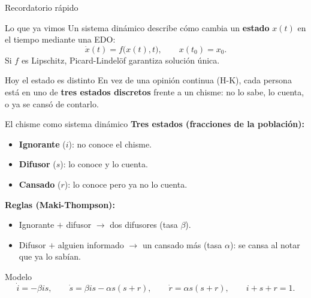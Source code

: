 \documentclass[aspectratio=169,10pt]{beamer}
\begin{document}
	\begin{frame}{Recordatorio r\'apido}
		\vspace{4pt}
		\begin{defbox}{Lo que ya vimos}
			Un sistema din\'amico describe c\'omo cambia un \textbf{estado}
			$x(t)$ en el tiempo mediante una EDO:
			\[
			\dot{x}(t) = f\!\bigl(x(t),t\bigr), \qquad x(t_0)=x_0.
			\]
			Si $f$ es Lipschitz, Picard-Lindel\"of garantiza soluci\'on \'unica.
		\end{defbox}
		
		\vspace{8pt}
		\begin{taskbox}{Hoy el estado es distinto}
			En vez de una opini\'on continua (H-K), cada persona est\'a en uno de
			\textbf{tres estados discretos} frente a un chisme: no lo sabe, lo
			cuenta, o ya se cans\'o de contarlo.
		\end{taskbox}
	\end{frame}
	
	\begin{frame}{El chisme como sistema din\'amico}
		\vspace{4pt}
		\textbf{Tres estados (fracciones de la poblaci\'on):}
		\begin{itemize}\small
			\item \textbf{Ignorante} ($i$): no conoce el chisme.
			\item \textbf{Difusor} ($s$): lo conoce y lo cuenta.
			\item \textbf{Cansado} ($r$): lo conoce pero ya no lo cuenta.
		\end{itemize}
		
		\vspace{6pt}
		\textbf{Reglas (Maki-Thompson):}
		\begin{itemize}\small
			\item Ignorante $+$ difusor $\to$ dos difusores (tasa $\beta$).
			\item Difusor $+$ alguien informado $\to$ un cansado m\'as
			(tasa $\alpha$): se cansa al notar que ya lo sab\'ian.
		\end{itemize}
		
		\vspace{6pt}
		\begin{defbox}{Modelo}
			\[
			\dot{i} = -\beta i s, \qquad
			\dot{s} = \beta i s - \alpha s(s+r), \qquad
			\dot{r} = \alpha s(s+r), \qquad i+s+r=1.
			\]
		\end{defbox}
	\end{frame}
	
\end{document}
